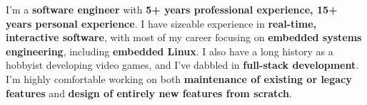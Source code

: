 I'm a \textbf{software engineer} with \textbf{5+ years professional experience, 15+ years personal experience}.
I have sizeable experience in \textbf{real-time, interactive software},
with most of my career focusing on \textbf{embedded systems engineering},
including \textbf{embedded Linux}.
I also have a long history as a hobbyist developing video games,
and I've dabbled in \textbf{full-stack development}.
I'm highly comfortable working on both \textbf{maintenance of existing or legacy features}
and \textbf{design of entirely new features from scratch}.
